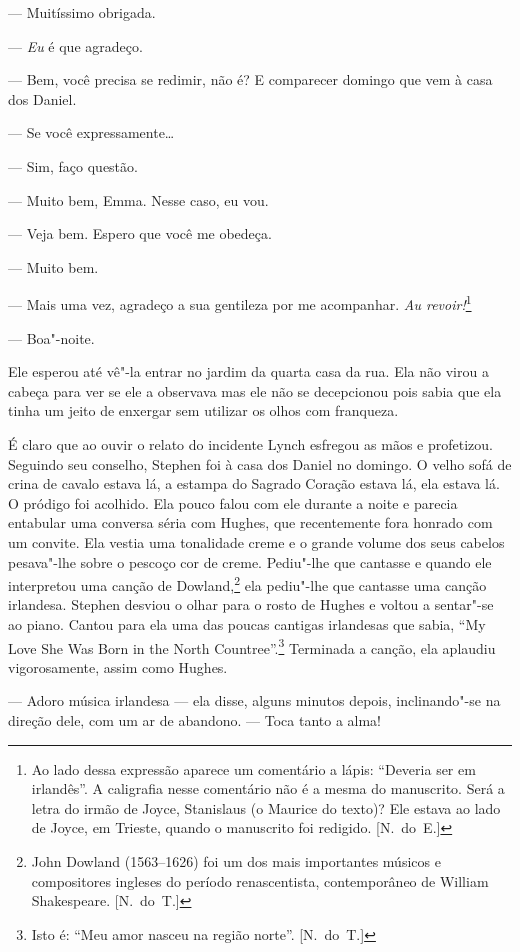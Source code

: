 --- Muitíssimo obrigada.

--- \textit{Eu} é que agradeço.

--- Bem, você precisa se redimir, não é?  E comparecer domingo que vem à casa
dos Daniel.

--- Se você expressamente\ldots{}

--- Sim, faço questão.

--- Muito bem, Emma.  Nesse caso, eu vou.

--- Veja bem.  Espero que você me obedeça.

--- Muito bem.

--- Mais uma vez, agradeço a sua gentileza por me acompanhar.  \textit{Au
revoir!}\footnote{ Ao lado dessa expressão aparece um comentário a lápis:
“Deveria ser em irlandês”.  A caligrafia nesse comentário não é a mesma do
manuscrito.  Será a letra do irmão de Joyce, Stanislaus (o Maurice do texto)?
Ele estava ao lado de Joyce, em Trieste, quando o manuscrito foi redigido. [N.~do~E.]}

--- Boa"-noite.

Ele esperou até vê"-la entrar no jardim da quarta casa da rua.  Ela não virou a
cabeça para ver se ele a observava mas ele não se decepcionou pois sabia que
ela tinha um jeito de enxergar sem utilizar os olhos com franqueza.

É claro que ao ouvir o relato do incidente Lynch esfregou as mãos e profetizou.
Seguindo seu conselho, Stephen foi à casa dos Daniel no domingo.  O velho sofá
de crina de cavalo estava lá, a estampa do Sagrado Coração estava lá, ela
estava lá.  O pródigo foi acolhido.  Ela pouco falou com ele durante a noite e
parecia entabular uma conversa séria com Hughes, que recentemente fora honrado
com um convite.  Ela vestia uma tonalidade creme e o grande volume dos seus
cabelos pesava"-lhe sobre o pescoço cor de creme.  Pediu"-lhe que cantasse e
quando ele interpretou uma canção de Dowland,\footnote{ John Dowland
(1563--1626) foi um dos mais importantes músicos e compositores ingleses do período renascentista,
contemporâneo de William Shakespeare. [N.~do~T.]} ela pediu"-lhe que cantasse uma
canção irlandesa.  Stephen desviou o olhar para o rosto de Hughes e voltou a
sentar"-se ao piano.  Cantou para ela uma das poucas cantigas irlandesas que
sabia, “My Love She Was Born in the North Countree”.\footnote{ Isto é: “Meu		
amor nasceu na região norte”. [N.~do~T.]}  Terminada a canção, ela aplaudiu			
vigorosamente, assim como Hughes.

--- Adoro música irlandesa --- ela disse, alguns minutos depois, inclinando"-se
na direção dele, com um ar de abandono.  --- Toca tanto a alma!

